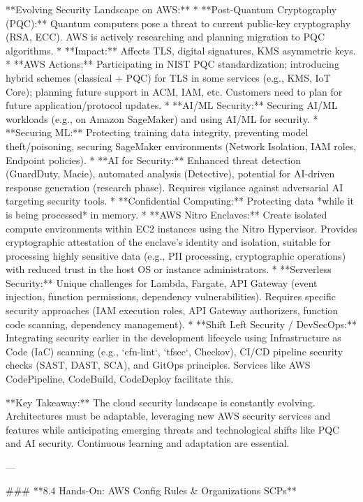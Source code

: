 \documentclass{article}
\begin{document}
**Evolving Security Landscape on AWS:**
* **Post-Quantum Cryptography (PQC):** Quantum computers pose a threat to current public-key cryptography (RSA, ECC). AWS is actively researching and planning migration to PQC algorithms.
    * **Impact:** Affects TLS, digital signatures, KMS asymmetric keys.
    * **AWS Actions:** Participating in NIST PQC standardization; introducing hybrid schemes (classical + PQC) for TLS in some services (e.g., KMS, IoT Core); planning future support in ACM, IAM, etc. Customers need to plan for future application/protocol updates.
* **AI/ML Security:** Securing AI/ML workloads (e.g., on Amazon SageMaker) and using AI/ML for security.
    * **Securing ML:** Protecting training data integrity, preventing model theft/poisoning, securing SageMaker environments (Network Isolation, IAM roles, Endpoint policies).
    * **AI for Security:** Enhanced threat detection (GuardDuty, Macie), automated analysis (Detective), potential for AI-driven response generation (research phase). Requires vigilance against adversarial AI targeting security tools.
* **Confidential Computing:** Protecting data *while it is being processed* in memory.
    * **AWS Nitro Enclaves:** Create isolated compute environments within EC2 instances using the Nitro Hypervisor. Provides cryptographic attestation of the enclave's identity and isolation, suitable for processing highly sensitive data (e.g., PII processing, cryptographic operations) with reduced trust in the host OS or instance administrators.
* **Serverless Security:** Unique challenges for Lambda, Fargate, API Gateway (event injection, function permissions, dependency vulnerabilities). Requires specific security approaches (IAM execution roles, API Gateway authorizers, function code scanning, dependency management).
* **Shift Left Security / DevSecOps:** Integrating security earlier in the development lifecycle using Infrastructure as Code (IaC) scanning (e.g., `cfn-lint`, `tfsec`, Checkov), CI/CD pipeline security checks (SAST, DAST, SCA), and GitOps principles. Services like AWS CodePipeline, CodeBuild, CodeDeploy facilitate this.

**Key Takeaway:** The cloud security landscape is constantly evolving. Architectures must be adaptable, leveraging new AWS security services and features while anticipating emerging threats and technological shifts like PQC and AI security. Continuous learning and adaptation are essential.

---

### **8.4 Hands-On: AWS Config Rules & Organizations SCPs**
\end{document}
